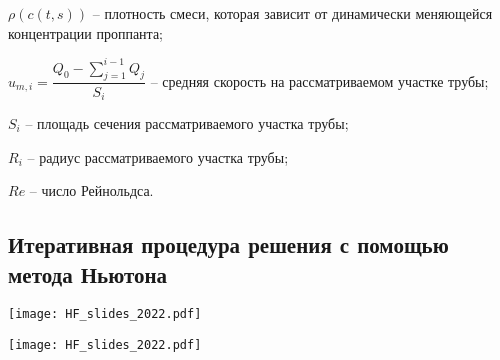 \documentclass[main.tex]{subfiles}
\begin{document}
$\rho(c(t,s))$ -- плотность смеси, которая зависит от динамически меняющейся концентрации проппанта;

$u_{m,i}=\dfrac{Q_0-\sum\limits_{j=1}^{i-1}{Q_j}}{S_i}$ -- средняя скорость на рассматриваемом участке трубы;

$S_i$ -- площадь сечения рассматриваемого участка трубы;

$R_i$ -- радиус рассматриваемого участка трубы;

$Re$ -- число Рейнольдса.

\subsection{Итеративная процедура решения с помощью метода Ньютона}

\texttt{[image: HF\_slides\_2022.pdf]}

\texttt{[image: HF\_slides\_2022.pdf]}
\end{document}
